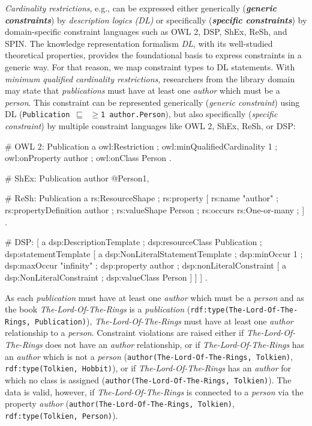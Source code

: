 \documentclass{llncs}
\newcommand{\ms}[1]{\texttt{#1}}
\begin{document}
\emph{Cardinality restrictions}, e.g., can be expressed either generically (\textbf{\emph{generic constraints}}) by \emph{description logics (DL)} 
or specifically (\textbf{\emph{specific constraints}}) by domain-specific constraint languages such as OWL 2, DSP, ShEx, ReSh, and SPIN.
The knowledge representation formalism {\em DL}, with its  well-studied theoretical properties, provides the foundational basis to express constraints in a generic way. 
For that reason, we map constraint types to DL statements.
With \emph{minimum qualified cardinality restrictions}, researchers from the library domain may state
that \emph{publications} must have at least one \emph{author} which must be a \emph{person}.
This constraint can be represented generically (\emph{generic constraint}) using DL (\ms{Publication $\sqsubseteq$ $\geq$1 author.Person}), but also specifically (\emph{specific constraint}) by multiple constraint languages like OWL 2, ShEx, ReSh, or DSP:

\begin{ex}
# OWL 2:
Publication
    a owl:Restriction ;
    owl:minQualifiedCardinality 1 ;
    owl:onProperty author ;
    owl:onClass Person .
		
# ShEx:
Publication { author @Person{1, } }

# ReSh:
Publication a rs:ResourceShape ; rs:property [
    rs:name "author" ; rs:propertyDefinition author ;
    rs:valueShape Person ;
    rs:occurs rs:One-or-many ; ] .
		
# DSP:
[   a dsp:DescriptionTemplate ; 
    dsp:resourceClass Publication ; 
    dsp:statementTemplate [ a dsp:NonLiteralStatementTemplate ;
        dsp:minOccur 1 ; dsp:maxOccur "infinity" ; 
        dsp:property author ; 
        dsp:nonLiteralConstraint [ a dsp:NonLiteralConstraint ;
            dsp:valueClass Person ] ] ] .
\end{ex}

As each \emph{publication} must have at least one \emph{author} which must be a \emph{person} 
and as the book \emph{The-Lord-Of-The-Rings} is a \emph{publication} (\ms{rdf:type(The-Lord-Of-The-Rings, Publication)}), 
\emph{The-Lord-Of-The-Rings} must have at least one \emph{author} relationship to a \emph{person}.
Constraint violations are raised either if
\emph{The-Lord-Of-The-Rings} does not have an \emph{author} relationship, or if 
\emph{The-Lord-Of-The-Rings} has an \emph{author} which is not a \emph{person}
(\ms{author(The-Lord-Of-The-Rings, Tolkien)}, \ms{rdf:type(Tolkien, Hobbit)}), 
or if \emph{The-Lord-Of-The-Rings} has an \emph{author} for which no class is assigned
(\ms{author(The-Lord-Of-The-Rings, Tolkien)}).
The data is valid, however, if \emph{The-Lord-Of-The-Rings} is connected to a \emph{person} via the property \emph{author}
(\ms{author(The-Lord-Of-The-Rings, Tolkien)}, \ms{rdf:type(Tolkien, Person)}).
\end{document}
